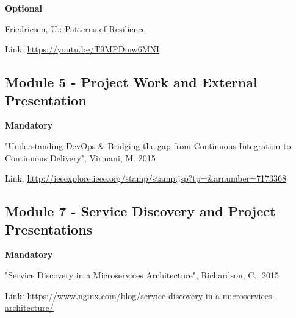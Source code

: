 \noindent\textbf{Optional}
\begin{compactitem}
  \item Friedricsen, U.: Patterns of Resilience
  \begin{compactitem}
  	\item Link: \url{ https://youtu.be/T9MPDmw6MNI }
  \end{compactitem}
  
\end{compactitem}

\subsection*{Module 5 - Project Work and External Presentation}

\textbf{Mandatory}
\begin{compactitem}
\setlength\itemsep{0.05em}
  \item "Understanding DevOps \& Bridging the gap from Continuous Integration to Continuous Delivery", Virmani, M. 2015
  \begin{compactitem}
  	\item Link: \url{http://ieeexplore.ieee.org/stamp/stamp.jsp?tp=&arnumber=7173368} 
  \end{compactitem}

\end{compactitem}


\subsection*{Module 7 - Service Discovery and Project Presentations}

\textbf{Mandatory}
\begin{compactitem}
\setlength\itemsep{0.05em}
  \item "Service Discovery in a Microservices Architecture", Richardson, C., 2015
  \begin{compactitem}
  	\item Link: \url{https://www.nginx.com/blog/service-discovery-in-a-microservices-architecture/} 
  \end{compactitem}

\end{compactitem}
